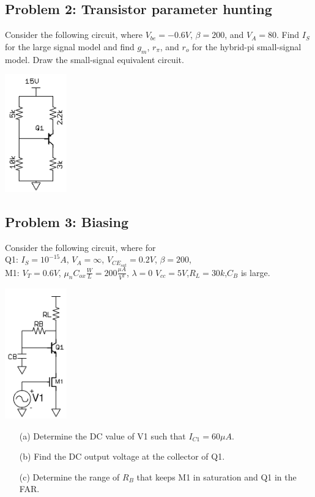 \documentclass[11pt,twoside]{article}
\begin{document}
\subsection*{Problem 2: Transistor parameter hunting}
Consider the following circuit, where $V_{be}=-0.6V$, $\beta=200$, and $V_A=80$.
Find $I_S$ for the large signal model and find $g_m$, $r_\pi$, and $r_o$ for the hybrid-pi small-signal model.
Draw the small-signal equivalent circuit.		

\begin{center}
\includegraphics[width=0.2\textwidth]{params.png}
\end{center}

\subsection*{Problem 3: Biasing}
Consider the following circuit, where for\\
Q1: $I_S=10^{-15}A$, $V_A=\infty$, $V_{CE_{sat}}=0.2V$, $\beta=200$,\\
M1: $V_T = 0.6V$, $\mu_nC_{ox}\frac{W}{L}=200\frac{\mu A}{V^2}$, $\lambda=0$
$V_{cc}=5V$,$R_L=30k$,$C_B$ is large. 

\begin{center}
\includegraphics[width=0.2\textwidth]{biasing.png}
\end{center}

\begin{enumerate}
\item[(a)] Determine the DC value of V1 such that $I_{C1}=60\mu A$.
\item[(b)] Find the DC output voltage at the collector of Q1.
\item[(c)] Determine the range of $R_B$ that keeps M1 in saturation and Q1 in the FAR.
\end{enumerate}
\end{document}
